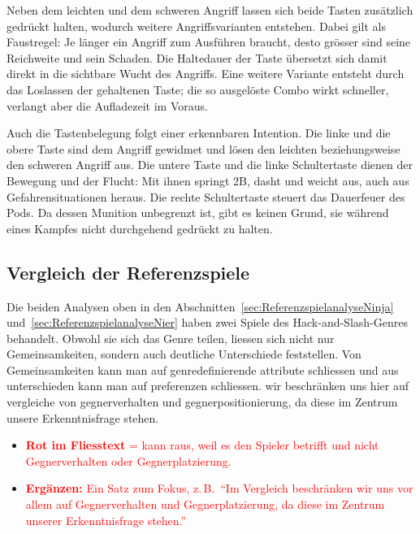 \documentclass[../Main.tex]{subfiles}
\begin{document}
Neben dem leichten und dem schweren Angriff lassen sich beide Tasten zusätzlich gedrückt halten, wodurch weitere Angriffsvarianten entstehen. Dabei gilt als Faustregel: Je länger ein Angriff zum Ausführen braucht, desto grösser sind seine Reichweite und sein Schaden. Die Haltedauer der Taste übersetzt sich damit direkt in die sichtbare Wucht des Angriffs. Eine weitere Variante entsteht durch das Loslassen der gehaltenen Taste; die so ausgelöste Combo wirkt schneller, verlangt aber die Aufladezeit im Voraus.

Auch die Tastenbelegung folgt einer erkennbaren Intention. Die linke und die obere Taste sind dem Angriff gewidmet und lösen den leichten beziehungsweise den schweren Angriff aus. Die untere Taste und die linke Schultertaste dienen der Bewegung und der Flucht: Mit ihnen springt 2B, dasht und weicht aus, auch aus Gefahrensituationen heraus. Die rechte Schultertaste steuert das Dauerfeuer des Pods. Da dessen Munition unbegrenzt ist, gibt es keinen Grund, sie während eines Kampfes nicht durchgehend gedrückt zu halten.

\subsection{Vergleich der Referenzspiele} \label{sec:Vergleich}

Die beiden Analysen oben in den Abschnitten~\ref{sec:ReferenzspielanalyseNinja} und~\ref{sec:ReferenzspielanalyseNier} haben zwei Spiele des Hack-and-Slash-Genres behandelt. Obwohl sie sich das Genre teilen, liessen sich nicht nur Gemeinsamkeiten, sondern auch deutliche Unterschiede feststellen. Von Gemeinsamkeiten kann man auf genredefinierende attribute schliessen und aus unterschieden kann man auf preferenzen schliessen. wir beschränken uns hier auf vergleiche von gegnerverhalten und gegnerpositionierung, da diese im Zentrum unsere Erkenntnisfrage stehen.

\begin{itemize}[leftmargin=1.5cm]
    \item \textcolor{red}{\textbf{Rot im Fliesstext} = kann raus, weil es den Spieler betrifft und nicht Gegnerverhalten oder Gegnerplatzierung.}
    \item \textcolor{red}{\textbf{Ergänzen:} Ein Satz zum Fokus, z.\,B.\ \enquote{Im Vergleich beschränken wir uns vor allem auf Gegnerverhalten und Gegnerplatzierung, da diese im Zentrum unserer Erkenntnisfrage stehen.}}
\end{itemize}
\end{document}

